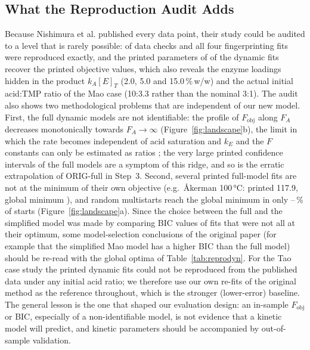 \subsection{What the Reproduction Audit Adds}
Because Nishimura et al. published every data point, their study could be audited to a level that is rarely possible: \NCheckPass{} of \NCheckAll{} data checks and all four fingerprinting fits were reproduced exactly, and the printed parameters of \ReproConsistent{} of the \ReproAll{} dynamic fits recover the printed objective values, which also reveals the enzyme loadings hidden in the product $k_A[E]_T$ (2.0, 5.0 and 15.0\,\%\,w/w) and the actual initial acid:TMP ratio of the Mao case (10:3.3 rather than the nominal 3:1). The audit also shows two methodological problems that are independent of our new model. First, the full dynamic models are not identifiable: the profile of $F_\mathrm{obj}$ along $F_A$ decreases monotonically towards $F_A\to\infty$ (Figure~\ref{fig:landscape}b), the limit in which the rate becomes independent of acid saturation and $k_E$ and the $F$ constants can only be estimated as ratios \cite{raue2009,transtrum2015}; the very large printed confidence intervals of the full models are a symptom of this ridge, and so is the erratic extrapolation of ORIG-full in Step~3. Second, several printed full-model fits are not at the minimum of their own objective (e.g.\ Åkerman 100\,°C: printed 117.9, global minimum \AkHundredFullGlobal{}), and random multistarts reach the global minimum in only \LandMinFrac--\LandMaxFrac\,\% of starts (Figure~\ref{fig:landscape}a). Since the choice between the full and the simplified model was made by comparing BIC values of fits that were not all at their optimum, some model-selection conclusions of the original paper (for example that the simplified Mao model has a higher BIC than the full model) should be re-read with the global optima of Table~\ref{tab:reprodyn}. For the Tao case study the printed dynamic fits could not be reproduced from the published data under any initial acid ratio; we therefore use our own re-fits of the original method as the reference throughout, which is the stronger (lower-error) baseline. The general lesson is the one that shaped our evaluation design: an in-sample $F_\mathrm{obj}$ or BIC, especially of a non-identifiable model, is not evidence that a kinetic model will predict, and kinetic parameters should be accompanied by out-of-sample validation.

